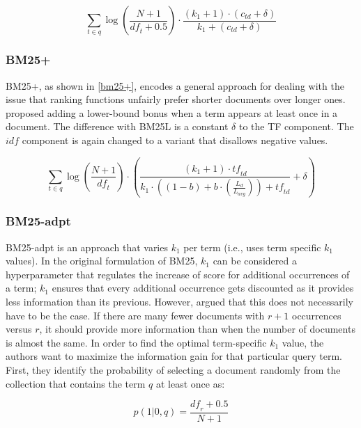 \begin{equation}
	\label{bm25l}
	\sum_{t\in q} \log\left(\frac{N+1}{\mathit{df}_t + 0.5}\right)\cdot\frac{(k_1 + 1)\cdot(c_{\mathit{td}} + \delta)}{k_1 + (c_{\mathit{td}} + \delta)}
\end{equation}

\subsubsection{BM25+~\citep{bm25+}}
BM25+, as shown in \cref{bm25+}, encodes a general approach for dealing with the issue that ranking functions unfairly prefer shorter documents over longer ones.  proposed adding a lower-bound bonus when a term appears at least once in a document. The difference with BM25L is a constant $\delta$ to the TF component. The $\mathit{idf}$ component is again changed to a variant that disallows negative values.

\begin{equation}
	\label{bm25+}
	\sum_{t\in q} \log\left(\frac{N+1}{\mathit{df}_t}\right)\cdot\left(\frac{\left(k_1 + 1\right)\cdot \mathit{tf}_{\mathit{td}}}{k_1\cdot\left(\left(1-b\right)+b\cdot\left(\frac{L_d}{L_{\mathit{avg}}}\right)\right)+\mathit{tf}_{\mathit{td}}}+\delta\right)
\end{equation}

\subsubsection{BM25-adpt~\citep{bm25-adpt}}
BM25-adpt is an approach that varies $k_1$ per term (i.e., uses term specific $k_1$ values). In the original formulation of BM25, $k_1$ can be considered a hyperparameter that regulates the increase of score for additional occurrences of a term; $k_1$ ensures that every additional occurrence gets discounted as it provides less information than its previous. However, \citeauthor{bm25-adpt} argued that this does not necessarily have to be the case. If there are many fewer documents with $r+1$ occurrences versus $r$, it should provide more information than when the number of documents is almost the same. In order to find the optimal term-specific $k_1$ value, the authors want to maximize the information gain for that particular query term. 
First, they identify the probability of selecting a document randomly from the collection that contains the term $q$ at least once as:

\begin{equation}
	p(1|0,q) = \frac{\mathit{df}_r+0.5}{N+1}
\end{equation}

